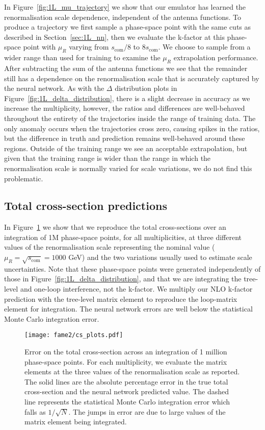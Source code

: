 \documentclass[main.tex]{subfiles}
\begin{document}
In Figure~\ref{fig:1L_mu_trajectory} we show that our
emulator has learned the renormalisation scale dependence,
independent of the antenna functions. To produce
a trajectory we first sample a phase-space point with
the same cuts as described in Section~\ref{sec:1L_nn}, then we
evaluate the k-factor at this phase-space point with $\mu_{R}$
varying from $s_{\mathrm{com}}/8$ to $8s_{\mathrm{com}}$.
We choose to sample from a wider range than used for training
to examine the $\mu_{R}$ extrapolation performance.
After subtracting the sum of the antenna functions we see that the
remainder still has a dependence on the renormalisation
scale that is accurately captured by the neural network.
As with the $\Delta$ distribution plots in Figure~\ref{fig:1L_delta_distribution},
there is a slight decrease in accuracy as we increase the
multiplicity, however, the ratios and differences are well-behaved
throughout the entirety of the trajectories inside the
range of training data. The only anomaly occurs when the
trajectories cross zero, causing spikes in the ratios,
but the difference in truth and prediction remains well-behaved
around these regions. Outside of the training
range we see an acceptable extrapolation, but given that
the training range is wider than the range in which the
renormalisation scale is normally varied for scale
variations, we do not find this problematic.

\subsection{Total cross-section predictions}
In Figure~\ref{fig:1L_cross_section} we show that we reproduce
the total cross-sections over an integration of 1M phase-space
points, for all multiplicities, at three
different values of the renormalisation scale representing the
nominal value ($\mu_{R} = \sqrt{s_{\mathrm{com}}} = 1000$ GeV)
and the two variations usually used to estimate scale uncertainties.
Note that these phase-space points were
generated independently of those in Figure~\ref{fig:1L_delta_distribution},
and that we are integrating the tree-level and one-loop interference, not the k-factor.
We multiply our NLO k-factor prediction with the {\MadGraph} tree-level
matrix element to reproduce the loop-matrix element for integration.
The neural network errors are well
below the statistical Monte Carlo integration error.

\begin{figure}
    \texttt{[image: fame2/cs\_plots.pdf]}
    \caption{Error on the total cross-section across an integration
    of 1 million phase-space points. For each multiplicity, we
    evaluate the matrix elements at the three values of the 
    renormalisation scale as reported.
    The solid lines are the absolute percentage error in the true total
    cross-section and the neural network predicted value. The dashed
    line represents the statistical Monte Carlo integration error
    which falls as $1/\sqrt{N}$. The jumps in error are due to large
    values of the matrix element being integrated.}
    \label{fig:1L_cross_section}
\end{figure}
\end{document}
